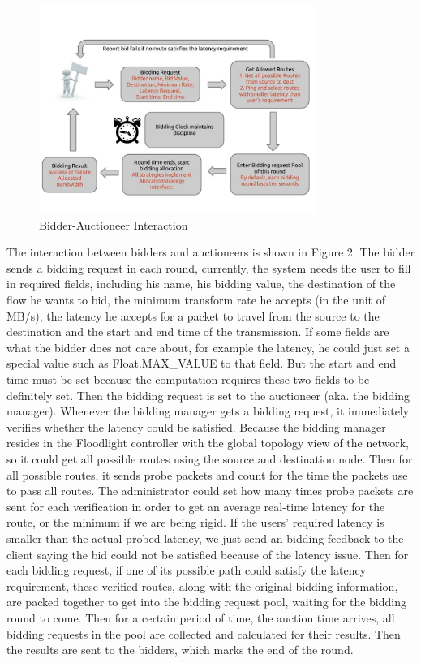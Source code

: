 \documentclass[a4paper,11pt,twocolumn]{article}
\begin{document}
\begin{figure}[ht!]
\centering
\includegraphics[width=90mm]{flow.jpg}
\caption{Bidder-Auctioneer Interaction}
\label{overflow}
\end{figure}
The interaction between bidders and auctioneers is shown in Figure 2. The bidder sends a bidding request in each round, currently, the 
system needs the user to fill in required fields, including his name, his bidding value, the destination of the flow he wants to bid,
the minimum transform rate he accepts (in the unit of MB/s), the latency he accepts for a packet to 
travel from the source to the destination and the start and end time of the transmission. If 
some fields are what the bidder does not care about, for example the latency, he could just set a special value such as Float.MAX\_VALUE to that field. But 
the start and end time must be set because the computation requires these two fields to be definitely set. Then the bidding request is set 
to the auctioneer (aka. the bidding manager). Whenever the bidding manager gets a bidding request, it immediately verifies whether the latency
could be satisfied. Because the bidding manager resides in the Floodlight controller with the global topology view of the network, so it could
get all possible routes using the source and destination node. Then for all possible routes, it sends probe packets and count for the time the 
packets use to pass all routes. The administrator could set how many times probe packets are sent for each verification in order to get an 
average real-time latency for the route, or the minimum if we are being rigid. If the users' required latency is smaller than the actual probed latency, we just send an bidding 
feedback to the client saying the bid could not be satisfied because of the latency issue. Then for each bidding request, if one of its possible
path could satisfy the latency requirement, these verified routes, along with the original bidding information, are packed together to get into
the bidding request pool, waiting for the bidding round to come. Then for a certain period of time, the auction time arrives, all bidding requests
in the pool are collected and calculated for their results. Then the results are sent to the bidders, which marks the end of the round.
\end{document}
